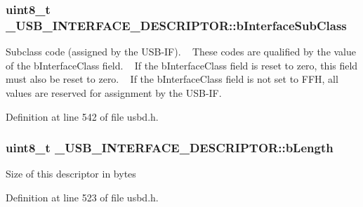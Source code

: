 \subsubsection[{\texorpdfstring{b\+Interface\+Sub\+Class}{bInterfaceSubClass}}]{\setlength{\rightskip}{0pt plus 5cm}uint8\+\_\+t \+\_\+\+U\+S\+B\+\_\+\+I\+N\+T\+E\+R\+F\+A\+C\+E\+\_\+\+D\+E\+S\+C\+R\+I\+P\+T\+O\+R\+::b\+Interface\+Sub\+Class}\hypertarget{struct__USB__INTERFACE__DESCRIPTOR_af88328ec7f751751f3397df1c4c032b2}{}\label{struct__USB__INTERFACE__DESCRIPTOR_af88328ec7f751751f3397df1c4c032b2}
Subclass code (assigned by the U\+S\+B-\/\+IF). ~\newline
These codes are qualified by the value of the b\+Interface\+Class field. ~\newline
If the b\+Interface\+Class field is reset to zero, this field must also be reset to zero. ~\newline
If the b\+Interface\+Class field is not set to F\+FH, all values are reserved for assignment by the U\+S\+B-\/\+IF. 

Definition at line 542 of file usbd.\+h.

\subsubsection[{\texorpdfstring{b\+Length}{bLength}}]{\setlength{\rightskip}{0pt plus 5cm}uint8\+\_\+t \+\_\+\+U\+S\+B\+\_\+\+I\+N\+T\+E\+R\+F\+A\+C\+E\+\_\+\+D\+E\+S\+C\+R\+I\+P\+T\+O\+R\+::b\+Length}\hypertarget{struct__USB__INTERFACE__DESCRIPTOR_a16fbd548f47d86ea2c045da5a091ed79}{}\label{struct__USB__INTERFACE__DESCRIPTOR_a16fbd548f47d86ea2c045da5a091ed79}
Size of this descriptor in bytes 

Definition at line 523 of file usbd.\+h.

